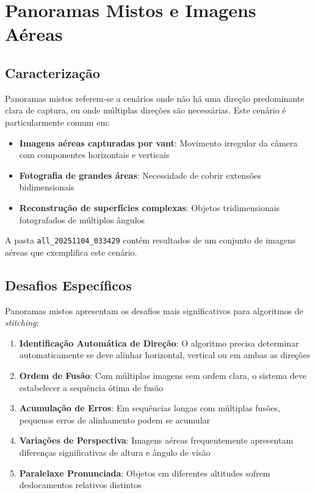 \section{Panoramas Mistos e Imagens Aéreas}

\subsection{Caracterização}

Panoramas mistos referem-se a cenários onde não há uma direção predominante clara de captura, ou onde múltiplas direções são necessárias. Este cenário é particularmente comum em:

\begin{itemize}
    \item \textbf{Imagens aéreas capturadas por \gls{vant}}: Movimento irregular da câmera com componentes horizontais e verticais
    \item \textbf{Fotografia de grandes áreas}: Necessidade de cobrir extensões bidimensionais
    \item \textbf{Reconstrução de superfícies complexas}: Objetos tridimensionais fotografados de múltiplos ângulos
\end{itemize}

A pasta \texttt{all\_20251104\_033429} contém resultados de um conjunto de imagens aéreas que exemplifica este cenário.

\subsection{Desafios Específicos}

Panoramas mistos apresentam os desafios mais significativos para algoritmos de \textit{stitching}:

\begin{enumerate}
    \item \textbf{Identificação Automática de Direção}: O algoritmo precisa determinar automaticamente se deve alinhar horizontal, vertical ou em ambas as direções

    \item \textbf{Ordem de Fusão}: Com múltiplas imagens sem ordem clara, o sistema deve estabelecer a sequência ótima de fusão

    \item \textbf{Acumulação de Erros}: Em sequências longas com múltiplas fusões, pequenos erros de alinhamento podem se acumular

    \item \textbf{Variações de Perspectiva}: Imagens aéreas frequentemente apresentam diferenças significativas de altura e ângulo de visão

    \item \textbf{Paralelaxe Pronunciada}: Objetos em diferentes altitudes sofrem deslocamentos relativos distintos
\end{enumerate}


